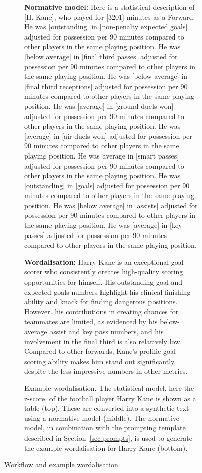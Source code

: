 \documentclass{article}
\begin{document}
\begin{figure}
\begin{subfigure}{\linewidth}
\begin{tcolorbox}[colback=white, colframe=black, boxrule=0.5mm, arc=0mm, left=1mm, right=1mm, top=1mm, bottom=1mm]
    \end{tcolorbox}
    \begin{tcolorbox}[colback=white, colframe=black, boxrule=0.5mm, arc=0mm, left=1mm, right=1mm, top=1mm, bottom=1mm]
        \textbf{Normative model:}
        Here is a statistical description of [H. Kane], who played for [3201] minutes as a Forward. He was [outstanding] in [non-penalty expected goals] adjusted for possession per 90 minutes compared to other players in the same playing position. He was [below average] in [final third passes] adjusted for possession per 90 minutes compared to other players in the same playing position. He was [below average] in [final third receptions] adjusted for possession per 90 minutes compared to other players in the same playing position. He was [average] in [ground duels won] adjusted for possession per 90 minutes compared to other players in the same playing position. He was [average] in [air duels won] adjusted for possession per 90 minutes compared to other players in the same playing position. He was average in [smart passes] adjusted for possession per 90 minutes compared to other players in the same playing position. He was [outstanding] in [goals] adjusted for possession per 90 minutes compared to other players in the same playing position. He was [below average] in [assists] adjusted for possession per 90 minutes compared to other players in the same playing position. He was [average] in [key passes] adjusted for possession per 90 minutes compared to other players in the same playing position.
    \end{tcolorbox}
    \begin{tcolorbox}[colback=white, colframe=black, boxrule=0.5mm, arc=0mm, left=1mm, right=1mm, top=1mm, bottom=1mm]
        \textbf{Wordalisation:} 
       Harry Kane is an exceptional goal scorer who consistently creates high-quality scoring opportunities for himself. His outstanding goal and expected goals numbers highlight his clinical finishing ability and knack for finding dangerous positions. However, his contributions in creating chances for teammates are limited, as evidenced by his below-average assist and key pass numbers, and his involvement in the final third is also relatively low. Compared to other forwards, Kane's prolific goal-scoring ability makes him stand out significantly, despite the less-impressive numbers in other metrics. 
     \end{tcolorbox}
    \caption{Example wordalisation. The statistical model, here the z-score, of the football player Harry Kane is shown as a table (top). These are converted into a synthetic text using a normative model (middle). The normative model, in combination with the prompting template described in Section~\ref{sec:prompts}, is used to generate the example wordalisation for Harry Kane (bottom). } \label{fig:wordalisation_example}
    \end{subfigure}
   \caption{Workflow and example wordalisation.}
\end{figure}
\end{document}
